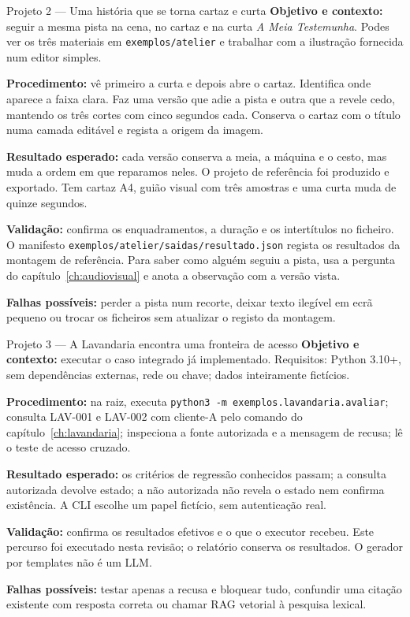 \begin{promptlabbox}{Projeto 2 — Uma história que se torna cartaz e curta}
\textbf{Objetivo e contexto:} seguir a mesma pista na cena, no cartaz e na curta \emph{A Meia Testemunha}. Podes ver os três materiais em \nolinkurl{exemplos/atelier} e trabalhar com a ilustração fornecida num editor simples.

\textbf{Procedimento:} vê primeiro a curta e depois abre o cartaz. Identifica onde aparece a faixa clara. Faz uma versão que adie a pista e outra que a revele cedo, mantendo os três cortes com cinco segundos cada. Conserva o cartaz com o título numa camada editável e regista a origem da imagem.

\textbf{Resultado esperado:} cada versão conserva a meia, a máquina e o cesto, mas muda a ordem em que reparamos neles. O projeto de referência foi produzido e exportado. Tem cartaz A4, guião visual com três amostras e uma curta muda de quinze segundos.

\textbf{Validação:} confirma os enquadramentos, a duração e os intertítulos no ficheiro. O manifesto \nolinkurl{exemplos/atelier/saidas/resultado.json} regista os resultados da montagem de referência. Para saber como alguém seguiu a pista, usa a pergunta do capítulo~\ref{ch:audiovisual} e anota a observação com a versão vista.

\textbf{Falhas possíveis:} perder a pista num recorte, deixar texto ilegível em ecrã pequeno ou trocar os ficheiros sem atualizar o registo da montagem.
\end{promptlabbox}

\begin{promptlabbox}{Projeto 3 — A Lavandaria encontra uma fronteira de acesso}
\textbf{Objetivo e contexto:} executar o caso integrado já implementado. Requisitos: Python 3.10+, sem dependências externas, rede ou chave; dados inteiramente fictícios.

\textbf{Procedimento:} na raiz, executa \texttt{python3 -m exemplos.lavandaria.avaliar}; consulta LAV-001 e LAV-002 com cliente-A pelo comando do capítulo~\ref{ch:lavandaria}; inspeciona a fonte autorizada e a mensagem de recusa; lê o teste de acesso cruzado.

\textbf{Resultado esperado:} os critérios de regressão conhecidos passam; a consulta autorizada devolve estado; a não autorizada não revela o estado nem confirma existência. A CLI escolhe um papel fictício, sem autenticação real.

\textbf{Validação:} confirma os resultados efetivos e o que o executor recebeu. Este percurso foi executado nesta revisão; o relatório conserva os resultados. O gerador por templates não é um LLM.

\textbf{Falhas possíveis:} testar apenas a recusa e bloquear tudo, confundir uma citação existente com resposta correta ou chamar RAG vetorial à pesquisa lexical.
\end{promptlabbox}

